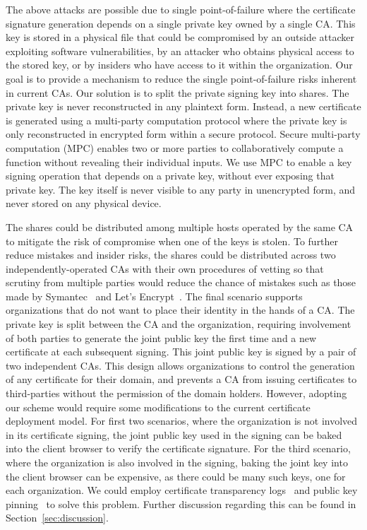 The above attacks are possible due to single point-of-failure where the certificate signature generation depends on a single private key owned by a single CA. This key is stored in a physical file that could be compromised by an outside attacker exploiting software vulnerabilities, by an attacker who obtains physical access to the stored key, or by insiders who have access to it within the organization. Our goal is to provide a mechanism to reduce the single point-of-failure risks inherent in current CAs.  Our solution is to split the private signing key into shares. The private key is never reconstructed in any plaintext form.  Instead, a new certificate is generated using a multi-party computation protocol where the private key is only reconstructed in encrypted form within a secure protocol.  Secure multi-party computation (MPC) enables two or more parties to collaboratively compute a function without revealing their individual inputs.  We use MPC to enable a key signing operation that depends on a private key, without ever exposing that private key. The key itself is never visible to any party in unencrypted form, and never stored on any physical device.

The shares could be distributed among multiple hosts operated by the same CA to mitigate the risk of compromise when one of the keys is stolen.  To further reduce mistakes and insider risks, the shares could be distributed across two independently-operated CAs with their own procedures of vetting so that scrutiny from multiple parties would reduce the chance of mistakes such as those made by Symantec~\cite{symantec_issues_wiki} and Let's Encrypt~\cite{lets_encrypt_paypal}. The final scenario supports organizations that do not want to place their identity in the hands of a CA. The private key is split between the CA and the organization, requiring involvement of both parties to generate the joint public key the first time and a new certificate at each subsequent signing. This joint public key is signed by a pair of two independent CAs. This design allows organizations to control the generation of any certificate for their domain, and prevents a CA from issuing certificates to third-parties without the permission of the domain holders. 
However, adopting our scheme would require some modifications to the current certificate deployment model. For first two scenarios, where the organization is not involved in its certificate signing, the joint public key used in the signing can be baked into the client browser to verify the certificate signature. For the third scenario, where the organization is also involved in the signing, baking the joint key into the client browser can be expensive, as there could be many such keys, one for each organization. We could employ certificate transparency logs~\cite{certificate_transparency} and public key pinning~\cite{public_key_pinning} to solve this problem. Further discussion regarding this can be found in Section~\ref{sec:discussion}.

